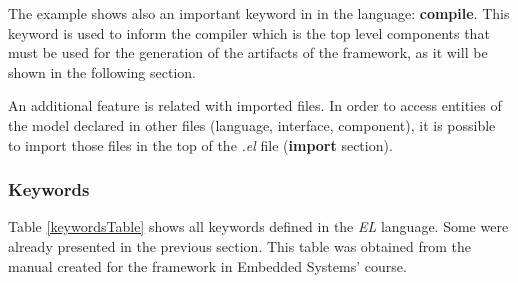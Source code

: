 The example shows also an important keyword in in the language: \textbf{compile}. This keyword is used to inform the compiler which is the top level components that must be used for the generation of the artifacts of the framework, as it will be shown in the following section.

An additional feature is related with imported files. In order to access entities of the model declared in other files (language, interface, component), it is possible to import those files in the top of the \textit{.el} file (\textbf{import} section).


\subsubsection*{Keywords} 

Table \ref{keywordsTable} shows all keywords defined in the \textit{EL} language. Some were already presented in the previous section. This table was obtained from the manual created for the framework in Embedded Systems' course. 

